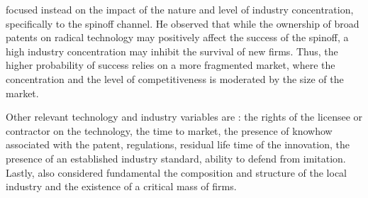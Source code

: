 \citet{Nerkar2003} focused instead on the impact of the nature and level of industry concentration, specifically to the spinoff channel. He observed that while the ownership of broad patents on radical technology may positively affect the success of the spinoff, a high industry concentration may inhibit the survival of new firms. Thus, the higher probability of success relies on a more fragmented market, where the concentration and the level of competitiveness is moderated by the size of the market. 

Other relevant technology and industry variables are \citep{Balderi2010}: the rights of the licensee or contractor on the technology, the time to market, the presence of knowhow associated with the patent, regulations, residual life time of the innovation, the presence of an established industry standard, ability to defend from imitation. Lastly, \citet{Geuna2009} also considered fundamental the composition and structure of the local industry and the existence of a critical mass of firms.
